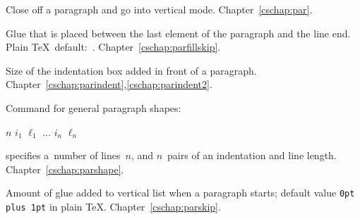 \begin{glossinventory}
\item [\cs{par}]
      Close off a paragraph and go into vertical mode.
Chapter~\ref{cschap:par}.

\item [\cs{parfillskip}]
      Glue that is placed between the last          
      element of the paragraph and the line end.
      Plain \TeX\ default:~.
Chapter~\ref{cschap:parfillskip}.

\item [\cs{parindent}]
      Size of the indentation box added in front of a paragraph.
Chapter~\ref{cschap:parindent},\ref{cschap:parindent2}.

\item [\cs{parshape}]
      Command for general paragraph shapes: 
      \begin{disp}$n$ $i_1$ $\ell_1$ $\ldots$
                $i_n$ $\ell_n$\end{disp}
      specifies a~number
      of lines~$n$, and $n$~pairs of an indentation and
      line length.
Chapter~\ref{cschap:parshape}.

\item [\cs{parskip}]
      Amount of glue added to vertical list when a paragraph starts; 
      default value \verb.0pt plus 1pt. in plain \TeX.
Chapter~\ref{cschap:parskip}.


\end{glossinventory}
